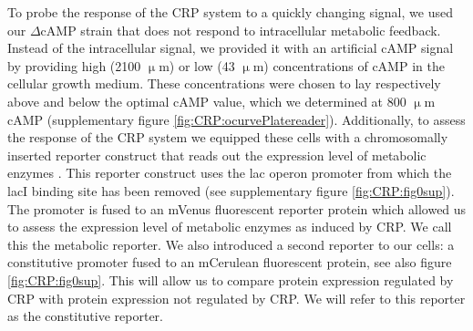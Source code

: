 To probe the response of the CRP system to a quickly changing signal, 
we used
our $\Delta$cAMP strain that does not respond to intracellular metabolic feedback.
Instead of the intracellular signal, we provided it with an artificial cAMP signal by providing high (2100 $\upmu$m) or low (43 $\upmu$m) concentrations of cAMP in the cellular growth medium.
%
These concentrations were chosen to lay respectively above and below the optimal cAMP value,
which we determined at 800 $\upmu$m cAMP (supplementary figure \ref{fig:CRP:ocurvePlatereader}).
%
Additionally, 
to assess the response of the CRP system we equipped these cells with a chromosomally inserted reporter construct that reads out the expression level of metabolic enzymes \cite{Towbin2017}.
%
%
%
This reporter construct uses the lac operon promoter from which the lacI binding site has been removed (see supplementary figure \ref{fig:CRP:fig0sup}).
The promoter is fused to an mVenus fluorescent reporter protein 
which allowed us to
assess
the expression level of metabolic enzymes as induced by CRP.
%
We call this the metabolic reporter.
%
We also introduced a second reporter to our cells: 
a constitutive promoter fused to an mCerulean fluorescent protein,
see also figure \ref{fig:CRP:fig0sup}.  
%
This will allow us to compare protein expression regulated by CRP
with protein expression not regulated by CRP.
%
We will refer to this reporter as the constitutive reporter.




